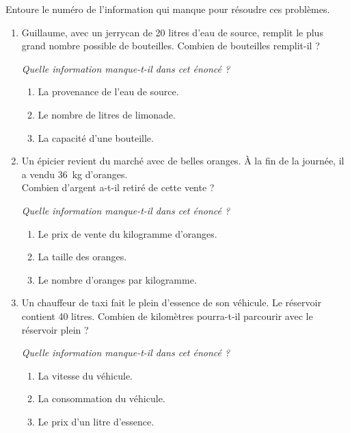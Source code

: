 \par
Entoure le numéro de l'information qui manque pour résoudre ces problèmes.
\begin{enumerate}[A/]
\item Guillaume, avec un jerrycan de 20 litres d'eau de source, remplit le plus grand nombre possible de bouteilles. Combien de bouteilles remplit-il ?
{\em Quelle information manque-t-il dans cet énoncé ?
\begin{enumerate}[1/]
\item La provenance de l'eau de source.
\item Le nombre de litres de limonade.
\item La capacité d'une bouteille.
\end{enumerate}
}
  \item Un épicier revient du marché avec de belles oranges. \`A la fin de la journée, il a vendu 36~kg d'oranges.\\Combien d'argent a-t-il retiré de cette vente ?
{\em Quelle information manque-t-il dans cet énoncé ?
\begin{enumerate}[1/]
\item Le prix de vente du kilogramme d'oranges.
\item La taille des oranges.
\item Le nombre d'oranges par kilogramme.
\end{enumerate}
}
\item Un chauffeur de taxi fait le plein d'essence de son véhicule. Le réservoir contient 40 litres. Combien de kilomètres pourra-t-il parcourir avec le réservoir plein ?
{\em Quelle information manque-t-il dans cet énoncé ?
\begin{enumerate}[1/]
\item La vitesse du véhicule.
\item La consommation du véhicule.
\item Le prix d'un litre d'essence.
\end{enumerate}
}
\end{enumerate}
